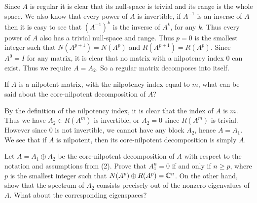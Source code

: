 \documentclass{article}
\begin{document}
\begin{solution}
  Since $A$ is regular it is clear that its null-space is trivial and its range is the whole space.
  We also know that every power of $A$ is invertible, if $A^{-1}$ is an inverse of $A$ then it is easy to see that $(A^{-1})^k$ is the inverse of $A^k$, for any $k$.
  Thus every power of $A$ also has a trivial null-space and range.
  Thus $p = 0$ is the smallest integer such that $N(A^{p + 1}) = N(A^p)$ and $R(A^{p + 1}) = R(A^p)$.
  Since $A^0 = I$ for any matrix, it is clear that no matrix with a nilpotency index $0$ can exist.
  Thus we require $A = A_2$.
  So a regular matrix decomposes into itself.
\end{solution}

\begin{problem}
  If $A$ is a nilpotent matrix, with the nilpotency index equal to $m$, what can be said about the core-nilpotent decomposition of $A$?
\end{problem}

\begin{solution}
  By the definition of the nilpotency index, it is clear that the index of $A$ is $m$.
  Thus we have $A_2 \in R(A^m)$ is invertible, or $A_2 = 0$ since $R(A^m)$ is trivial.
  However since $0$ is not invertible, we cannot have any block $A_2$, hence $A = A_1$.
  We see that if $A$ is nilpotent, then its core-nilpotent decomposition is simply $A$.
\end{solution}

\begin{problem}
  Let $A = A_1 \oplus A_2$ be the core-nilpotent decomposition of $A$ with respect to the notation and assumptions from (2).
  Prove that $A_1^n = 0$ if and only if $n \ge p$, where $p$ is the smallest integer such that $N(A^p) \oplus R(A^p) = \mathbb{C}^n$.
  On the other hand, show that the spectrum of $A_2$ consists precisely out of the nonzero eigenvalues of $A$.
  What about the corresponding eigenspaces?
\end{problem}
\end{document}
